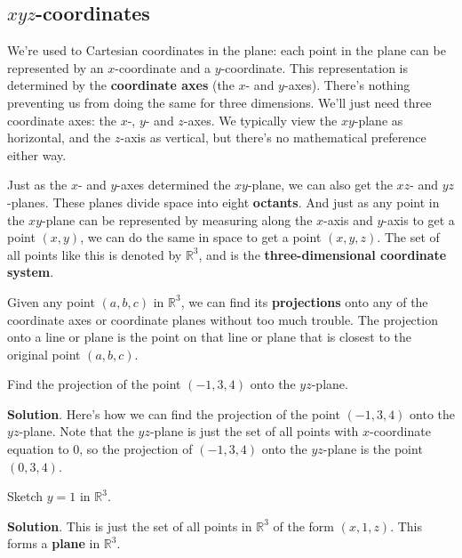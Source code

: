 \documentclass[10pt,]{book}
\newcommand{\terminology}[1]{\textbf{#1}}
\theoremstyle{ptxplainnotitle}
\theoremstyle{ptxplaintitle}
\theoremstyle{ptxplainnotitle}
\theoremstyle{ptxplaintitle}
\theoremstyle{ptxplainnotitle}
\theoremstyle{ptxplaintitle}
\theoremstyle{ptxdefinitionnotitle}
\theoremstyle{ptxdefinitiontitle}
\theoremstyle{ptxdefinitionnotitle}
\theoremstyle{ptxdefinitiontitle}
\theoremstyle{ptxdefinitionnotitle}
\theoremstyle{ptxdefinitiontitle}
\theoremstyle{ptxdefinitionnotitle}
\theoremstyle{ptxdefinitiontitle}
\theoremstyle{ptxdefinitionnotitle}
\theoremstyle{ptxdefinitiontitle}
\numberwithin{equation}{section}
\newcommand{\RR}{\mathbb{R}}
\begin{document}
\subsection[{\(xyz\)-coordinates}]{\(xyz\)-coordinates}\label{xyz-coordinates}
\hypertarget{p-719}{}%
We're used to Cartesian coordinates in the plane: each point in the plane can be represented by an \(x\)-coordinate and a \(y\)-coordinate. This representation is determined by the \terminology{coordinate axes} (the \(x\)- and \(y\)-axes). There's nothing preventing us from doing the same for three dimensions. We'll just need three coordinate axes: the \(x\)-, \(y\)- and \(z\)-axes. We typically view the \(xy\)-plane as horizontal, and the \(z\)-axis as vertical, but there's no mathematical preference either way.%
\par
\hypertarget{p-720}{}%
Just as the \(x\)- and \(y\)-axes determined the \(xy\)-plane, we can also get the \(xz\)- and \(yz\)-planes. These planes divide space into eight \terminology{octants}. And just as any point in the \(xy\)-plane can be represented by measuring along the \(x\)-axis and \(y\)-axis to get a point \((x,y)\), we can do the same in space to get a point \((x,y,z)\). The set of all points like this is denoted by \(\RR^{3}\), and is the \terminology{three-dimensional coordinate system}.%
\par
\hypertarget{p-721}{}%
Given any point \((a,b,c)\) in \(\RR^{3}\), we can find its \terminology{projections} onto any of the coordinate axes or coordinate planes without too much trouble. The projection onto a line or plane is the point on that line or plane that is closest to the original point \((a,b,c)\).%
\begin{example}[{Projection.}]\label{example-projection}
\hypertarget{p-722}{}%
Find the projection of the point \((-1,3,4)\) onto the \(yz\)-plane.%
\par\smallskip%
\noindent\textbf{Solution}.\hypertarget{solution-142}{}\quad%
\hypertarget{p-723}{}%
Here's how we can find the projection of the point \((-1,3,4)\) onto the \(yz\)-plane. Note that the \(yz\)-plane is just the set of all points with \(x\)-coordinate equation to \(0\), so the projection of \((-1,3,4)\) onto the \(yz\)-plane is the point \((0,3,4)\).%
\end{example}
\begin{example}\label{example-equations-in-space}
\hypertarget{p-724}{}%
Sketch \(y=1\) in \(\RR^{3}\).%
\par\smallskip%
\noindent\textbf{Solution}.\hypertarget{solution-143}{}\quad%
\hypertarget{p-725}{}%
This is just the set of all points in \(\RR^{3}\) of the form \((x,1,z)\). This forms a \terminology{plane} in \(\RR^{3}\).%
\end{example}
\end{document}
